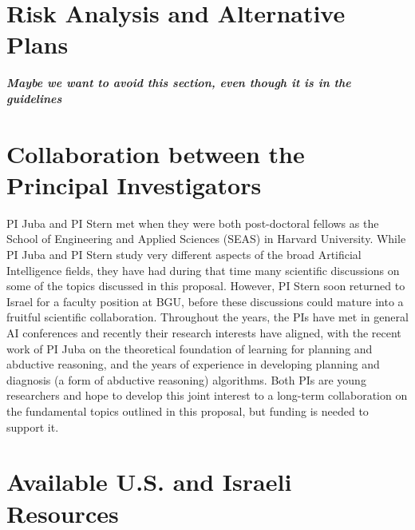 \documentclass[12pt]{article}
\newcommand{\note}[1]{\textbf{\textit{#1}}}
\begin{document}
\section{Risk Analysis and Alternative Plans}
\note{Maybe we want to avoid this section, even though it is in the guidelines}

\section{Collaboration between the Principal Investigators}
PI Juba and PI Stern met when they were both post-doctoral fellows as the School of Engineering and Applied Sciences (SEAS) in Harvard University. 
While PI Juba and PI Stern study very different aspects of the broad Artificial Intelligence fields, they have had during that time many scientific discussions on some of the topics discussed in this proposal. However, PI Stern soon returned to Israel for a faculty position at BGU, before these discussions could mature into a fruitful scientific collaboration. 
Throughout the years, the PIs have met in general AI conferences
and recently their research interests have aligned, 
with the recent work of PI Juba on the theoretical foundation of learning for planning and abductive reasoning, and the years of experience in developing planning and diagnosis (a form of abductive reasoning) algorithms. 
Both PIs are young researchers and hope to develop this joint interest to a long-term collaboration on the fundamental topics outlined in this proposal, but funding is needed to support it.  

\section{Available U.S. and Israeli Resources}






\pagebreak


\end{document}

